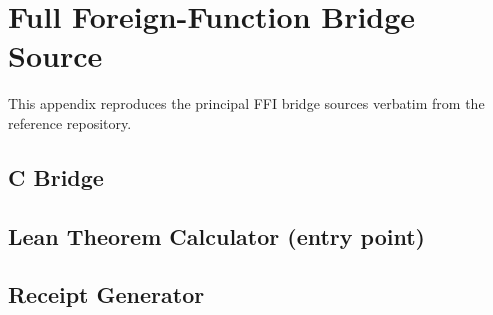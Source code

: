\chapter{Full Foreign-Function Bridge Source}
\label{app:ffi}

This appendix reproduces the principal FFI bridge sources verbatim from the
reference repository.

\section{C Bridge}


\section{Lean Theorem Calculator (entry point)}


\section{Receipt Generator}

